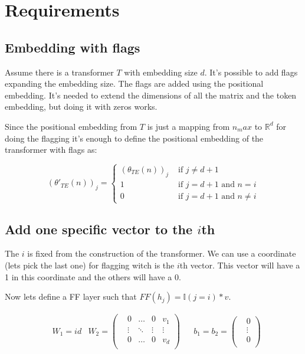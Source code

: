 \section*{Requirements}

\subsection*{Embedding with flags}


Assume there is a transformer $T$ with embedding size $d$. It's possible to add flags expanding the embedding size. The flags are added using the positional embedding. It's needed to extend the dimensions of all the matrix and the token embedding, but doing it with zeros works.

Since the positional embedding from $T$ is just a mapping from $n_max$ to $\mathbb{R}^d$ for doing the flagging it's enough to define the positional embedding of the transformer with flags as:

\begin{equation*}
    (\theta'_{TE}(n))_j = \begin{cases}
        (\theta_{TE}(n))_j  & \text{ if } j \neq d+1 \\
        1                   & \text{ if } j = d+1  \text{ and } n = i \\
        0                   & \text{ if } j = d+1  \text{ and } n \neq i
    \end{cases}
\end{equation*}



\subsection*{Add one specific vector to the $i$th}

The $i$ is fixed from the construction of the transformer. We can use a coordinate (lets pick the last one) for flagging witch is the $i$th vector. This vector will have a 1 in this coordinate and the others  will have a 0.

Now lets define a FF layer such that $FF(h_j) = \mathbb{I}(j=i)*v$.

\begin{align*}
    & W_1 = id
    & W_2  = \left(\begin{matrix}
        & 0         &\dots  &0      & v_1       \\
        & \vdots    &\ddots &\vdots & \vdots    \\
        & 0         &\dots  &0      & v_d       \\
    \end{matrix}\right) &
    & b_1 = b_2 = \left(\begin{matrix}
        & 0      \\
        & \vdots \\
        & 0      \\
    \end{matrix}\right) 
\end{align*}


